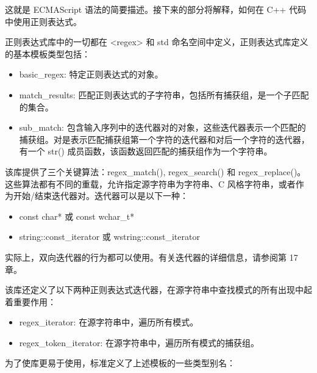 这就是 ECMAScript 语法的简要描述。接下来的部分将解释，如何在 C++ 代码中使用正则表达式。


正则表达式库中的一切都在 <regex> 和 std 命名空间中定义，正则表达式库定义的基本模板类型包括：

\begin{itemize}
\item
basic\_regex: 特定正则表达式的对象。

\item
match\_results: 匹配正则表达式的子字符串，包括所有捕获组，是一个子匹配的集合。

\item
sub\_match: 包含输入序列中的迭代器对的对象，这些迭代器表示一个匹配的捕获组。对是表示匹配捕获组第一个字符的迭代器和对后一个字符的迭代器，有一个 str() 成员函数，该函数返回匹配的捕获组作为一个字符串。
\end{itemize}

该库提供了三个关键算法：regex\_match(), regex\_search() 和 regex\_replace()。这些算法都有不同的重载，允许指定源字符串为字符串、C 风格字符串，或者作为开始/结束迭代器对。迭代器可以是以下一种：

\begin{itemize}
\item
const char* 或 const wchar\_t*

\item
string::const\_iterator 或 wstring::const\_iterator
\end{itemize}

实际上，双向迭代器的行为都可以使用。有关迭代器的详细信息，请参阅第 17 章。

该库还定义了以下两种正则表达式迭代器，在源字符串中查找模式的所有出现中起着重要作用：

\begin{itemize}
\item
regex\_iterator: 在源字符串中，遍历所有模式。

\item
regex\_token\_iterator: 在源字符串中，遍历所有模式的捕获组。
\end{itemize}

为了使库更易于使用，标准定义了上述模板的一些类型别名：


